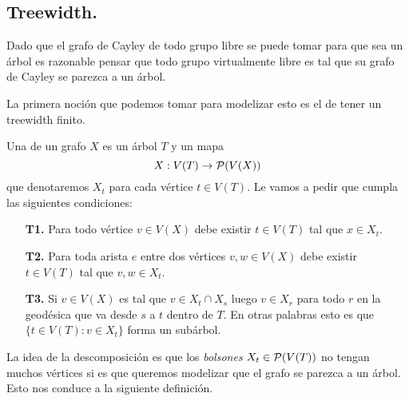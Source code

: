 \documentclass[tesis.tex]{subfiles}
\begin{document}
\subsection{Treewidth.}

Dado que el grafo de Cayley de todo grupo libre se puede tomar para que sea un árbol es razonable pensar que todo grupo virtualmente libre es tal que su grafo de Cayley se parezca a un árbol. 

La primera noción que podemos tomar para modelizar esto es el de tener un treewidth finito.

\begin{deff}\label{desc-arbol}
	Una  de un grafo $X$ es un árbol $T$ y un mapa 
	\[
	X: V(T) \to {\cal P}(V(X))
	\]
	que denotaremos $X_t$ para cada vértice $t \in V(T)$. 
	Le vamos a pedir que cumpla las siguientes condiciones:
	\begin{enumerate}
		\item[\textbf{T1.}] Para todo vértice $v \in V(X)$ debe existir $t \in V(T)$ tal que $x \in X_t$. 
		\item[\textbf{T2.}] Para toda arista $e$ entre dos vértices $v,w \in V(X)$ debe existir $t \in V(T)$ tal que $v,w \in X_t$.
		\item[\textbf{T3.}] Si $v \in V(X)$ es tal que $v \in X_t \cap X_s$ luego $v \in X_r$ para todo $r$ en la geodésica que va desde $s$ a $t$ dentro de $T$. En otras palabras esto es que $\{ t \in V(T) :  v \in X_t \}$ forma un subárbol. 
	\end{enumerate} 
\end{deff}
\smallskip

La idea de la descomposición es que los \emph{bolsones} $X_t \in {\cal P}(V(T))$ no tengan muchos vértices si es que queremos modelizar que el grafo se parezca a un árbol. Esto nos conduce a la siguiente definición.
\end{document}
